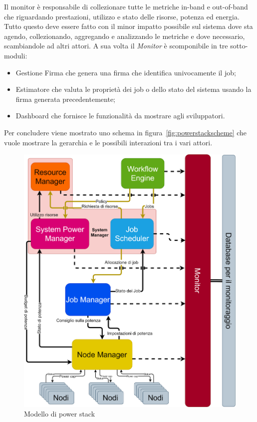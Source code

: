Il monitor è responsabile di collezionare tutte le metriche in-band e out-of-band che riguardando prestazioni, utilizzo e stato delle risorse, potenza ed energia.
Tutto questo deve essere fatto con il minor impatto possibile sul sistema dove sta agendo, collezionando, aggregando e analizzando le metriche e dove necessario, scambiandole ad altri attori. A sua volta il \emph{Monitor} è scomponibile in tre sotto-moduli:
\begin{itemize}
    \item Gestione Firma che genera una firma che identifica univocamente il job; 
    \item Estimatore che valuta le proprietà dei job o dello stato del sistema usando la firma generata precedentemente;
    \item Dashboard che fornisce le funzionalità da mostrare agli sviluppatori.
\end{itemize}


Per concludere viene mostrato uno schema in figura~\ref{fig:powerstackscheme} che vuole mostrare la gerarchia e le possibili interazioni tra i vari attori.
\begin{figure}[H]
    \centering
    \includegraphics[width=\textwidth]{img/SchemaPowerStack.drawio.png}
    \caption{Modello di power stack}\label{fig:minpowerstackscheme}
\end{figure}


